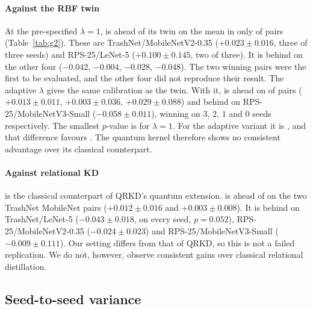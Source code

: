 \begin{table}[t]
  \centering
  \caption{Test macro-F1 of the twin \Rbf and the paired difference $\mathtt{pqk}-\mathtt{rbf\_control}$ for the two $\lambda$ calibrations of \Pqk. Adaptive $\lambda$ has one seed on the LeNet-5 pairs and is omitted there. $^{\S}$See Table~\ref{tab:main}.}
  \label{tab:g2}
\end{table}

\paragraph{Against the RBF twin}
At the pre-specified $\lambda=1$, \Pqk is ahead of its twin on the mean in only \GtwoFixedWins{} of \NPairs{} pairs (Table~\ref{tab:g2}). These are TrashNet/MobileNetV2-0.35 ($+0.023\pm0.016$, three of three seeds) and RPS-25/LeNet-5 ($+0.100\pm0.145$, two of three). It is behind on the other four ($-0.042$, $-0.004$, $-0.028$, $-0.048$).
The two winning pairs were the first to be evaluated, and the other four did not reproduce their result.
The adaptive $\lambda$ gives \Pqk the same calibration as the twin. With it, \Pqk is ahead on \GtwoAdaptWins{} of \GtwoAdaptPairs{} pairs ($+0.013\pm0.011$, $+0.003\pm0.036$, $+0.029\pm0.088$) and behind on RPS-25/MobileNetV3-Small ($-0.058\pm0.011$), winning on $3$, $2$, $1$ and $0$ seeds respectively.
The smallest $p$-value is \MinPRbfFixed{} for $\lambda=1$. For the adaptive variant it is \MinPRbfAdapt{}, and that difference favours \MinPRbfAdaptFavours.
The quantum kernel therefore shows no consistent advantage over its classical counterpart.

\paragraph{Against relational KD}
\Rkd is the classical counterpart of QRKD's quantum extension.
\Pqk is ahead of \Rkd on the two TrashNet MobileNet pairs ($+0.012\pm0.016$ and $+0.003\pm0.008$). It is behind on TrashNet/LeNet-5 ($-0.043\pm0.018$, on every seed, $p=0.052$), RPS-25/MobileNetV2-0.35 ($-0.024\pm0.023$) and RPS-25/MobileNetV3-Small ($-0.009\pm0.111$).
Our setting differs from that of QRKD, so this is not a failed replication. We do not, however, observe consistent gains over classical relational distillation.

\subsection{Seed-to-seed variance}
\label{sec:results-variance}

